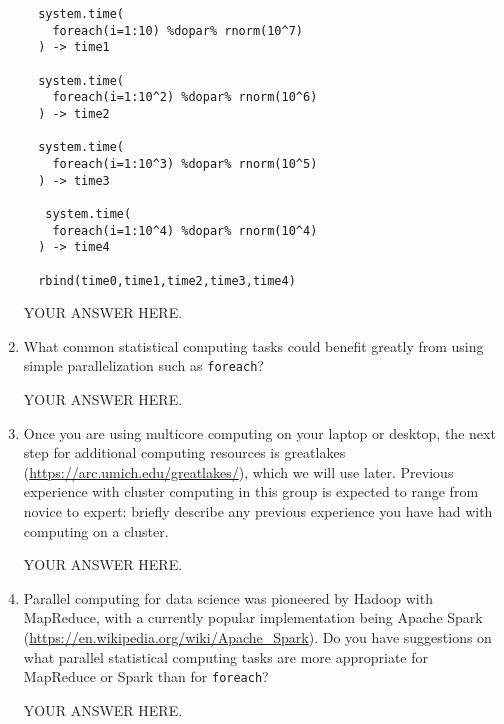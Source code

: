 \documentclass[12pt]{article}
\begin{document}
\begin{enumerate}
\begin{verbatim}
  system.time(
    foreach(i=1:10) %dopar% rnorm(10^7)
  ) -> time1

  system.time(
    foreach(i=1:10^2) %dopar% rnorm(10^6)
  ) -> time2

  system.time(
    foreach(i=1:10^3) %dopar% rnorm(10^5)
  ) -> time3

   system.time(
    foreach(i=1:10^4) %dopar% rnorm(10^4)
  ) -> time4
  
  rbind(time0,time1,time2,time3,time4)
\end{verbatim}

  YOUR ANSWER HERE.

\item What common statistical computing tasks could benefit greatly from using simple parallelization such as \texttt{foreach}?
  
YOUR ANSWER HERE.

\item Once you are using multicore computing on your laptop or desktop, the next step for additional computing resources is greatlakes (\url{https://arc.umich.edu/greatlakes/}), which we will use later. Previous experience with cluster computing in this group is expected to range from novice to expert: briefly describe any previous experience you have had with computing on a cluster.

  YOUR ANSWER HERE.

\item Parallel computing for data science was pioneered by Hadoop with MapReduce, with a currently popular implementation being Apache Spark (\url{https://en.wikipedia.org/wiki/Apache_Spark}). Do you have suggestions on what parallel statistical computing tasks are more appropriate for MapReduce or Spark than for \texttt{foreach}?

  YOUR ANSWER HERE.
  
\end{enumerate}
\end{document}
